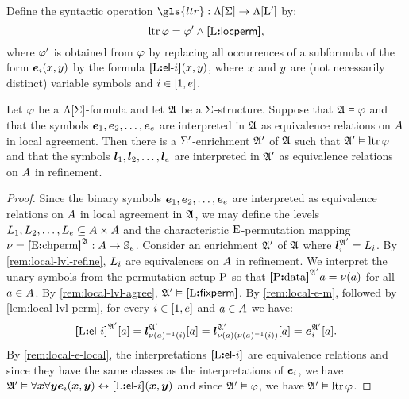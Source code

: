 \begin{definition}
Define the syntactic operation $\gls{ltr} : \aLF\SigS \to \aLF\LSp$
by:
\[
  \operatorname{ltr}\varphi = {\varphi'} \land {\bm{[}\mathrm{L}\mathord{\bm{:}}\mathsf{locperm}\bm{]}},
\]
where ${\varphi'}$ is obtained from $\varphi$ by replacing all occurrences of a
subformula of the form $\bm{e}_{i}(x,y)$ by the formula ${\bm{[}\mathrm{L}\mathord{\bm{:}}\mathsf{el}{\hbox{-}}i\bm{]}}(x,y)$, 
where $x$ and $y$ are (not necessarily distinct) variable symbols and
$i \in [1,e]$.
\end{definition}
\begin{remark}
Let $\varphi$ be a $\Lambda[\mathrm{\Sigma}]$-formula and let $\mathfrak{A}$ be a $\mathrm{\Sigma}$-structure.
Suppose that $\mathfrak{A} \vDash \varphi$ and that the symbols 
$\bm{e}_{1}, \bm{e}_{2}, \dots, \bm{e}_{e}$ are interpreted in $\mathfrak{A}$ as equivalence
relations on $A$ in local agreement.
Then there is a $\mathrm{\Sigma'}$-enrichment $\mathfrak{A'}$ of $\mathfrak{A}$ such that
$\mathfrak{A'} \vDash \operatorname{ltr}\varphi$ and that the symbols 
$\bm{l}_{1}, \bm{l}_{2}, \dots, \bm{l}_{e}$ are interpreted in $\mathfrak{A'}$ as equivalence
relations on $A$ in refinement.
\end{remark}
\begin{proof}
Since the binary symbols $\bm{e}_{1}, \bm{e}_{2}, \dots, \bm{e}_{e}$ are interpreted as
equivalence relations on $A$ in local agreement in $\mathfrak{A}$, we may define
the levels $L_{1}, L_{2}, \dots, L_{e} \subseteq {A\times A}$
and the characteristic $\mathrm{E}$-permutation mapping 
$\nu = {\bm{[}\mathrm{E}\mathord{\bm{:}}\mathrm{chperm}\bm{]}}^{\mathfrak{A}} : A \to \mathbb{S}_{e}$.
Consider an enrichment $\mathfrak{A'}$ of $\mathfrak{A}$ where 
$\bm{l}_{i}^{\mathfrak{A'}} = L_{i}$.
By \cref{rem:local-lvl-refine}, $L_{i}$ are equivalences on $A$ in
refinement.
We interpret the unary symbols from the
permutation setup $\mathrm{P}$ so that ${\bm{[}\mathrm{P}\mathord{\bm{:}}\mathrm{data}\bm{]}}^{\mathfrak{A'}}a = \nu(a)$ for all
$a \in A$.
By \cref{rem:local-lvl-agree}, $\mathfrak{A'} \vDash {\bm{[}\mathrm{L}\mathord{\bm{:}}\mathsf{fixperm}\bm{]}}$.
By \cref{rem:local-e-m}, followed by \cref{lem:local-lvl-perm},
for every $i \in [1,e]$ and $a \in A$ we have:
\[
  {\bm{[}\mathrm{L}\mathord{\bm{:}}\mathsf{el}{\hbox{-}}i\bm{]}}^{\mathfrak{A'}}[a] =
  \bm{l}_{\nu(a)^{-1}(i)}^{\mathfrak{A'}}[a] =
  \bm{l}_{\nu(a)(\nu(a)^{-1}(i))}^{\mathfrak{A'}}[a] =
  \bm{e}_{i}^{\mathfrak{A'}}[a].
\]
By \cref{rem:local-e-local}, the interpretations ${\bm{[}\mathrm{L}\mathord{\bm{:}}\mathsf{el}{\hbox{-}}i\bm{]}}$ are
equivalence relations and since they have the same classes as the
interpretations of $\bm{e}_{i}$, we have 
$\mathfrak{A'} \vDash \forall\bm{x} \forall\bm{y} \bm{e}_{i}(\bm{x},\bm{y}) \leftrightarrow {\bm{[}\mathrm{L}\mathord{\bm{:}}\mathsf{el}{\hbox{-}}i\bm{]}}(\bm{x},\bm{y})$
and since $\mathfrak{A'} \vDash \varphi$, we have $\mathfrak{A'} \vDash \operatorname{ltr}\varphi$.
\end{proof}

